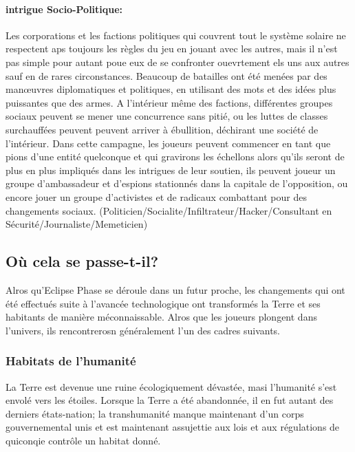 \paragraph{intrigue Socio-Politique:} Les corporations et les factions politiques qui couvrent tout le système solaire ne respectent aps toujours les règles du jeu en jouant avec les autres, mais il n'est pas simple pour autant poue eux de se confronter ouevrtement els uns aux autres sauf en de rares circonstances. Beaucoup de batailles ont été menées par des manœuvres diplomatiques et politiques, en utilisant des mots et des idées plus puissantes que des armes. A l'intérieur même des factions, différentes groupes sociaux peuvent se mener une concurrence sans pitié, ou les luttes de classes surchauffées peuvent peuvent arriver à ébullition, déchirant une société de l'intérieur. Dans cette campagne, les joueurs peuvent commencer en tant que pions d'une entité quelconque et qui gravirons les échellons alors qu'ils seront de plus en plus impliqués dans les intrigues de leur soutien, ils peuvent joueur un groupe d'ambassadeur et d'espions stationnés dans la capitale de l'opposition, ou encore jouer un groupe d'activistes et de radicaux combattant pour des changements sociaux. (Politicien/Socialite/Infiltrateur/Hacker/Consultant en Sécurité/Journaliste/Memeticien) 



\subsection{Où cela se passe-t-il?} \label{sec:where-does-it} 

Alros qu'Eclipse Phase se déroule dans un futur proche, les changements qui ont été effectués suite à l'avancée technologique ont transformés la Terre et ses habitants de manière méconnaissable. Alros que les joueurs plongent dans l'univers, ils rencontrerosn généralement l'un des cadres suivants. 



\subsubsection{Habitats de l'humanité} \label{sec:humanitys-habitats} 

La Terre est devenue une ruine écologiquement dévastée, masi l'humanité s'est envolé vers les étoiles. Lorsque la Terre a été abandonnée,  il en fut autant des derniers états-nation; la transhumanité manque maintenant d'un corps gouvernemental unis et est maintenant assujettie aux lois et aux régulations de quiconqie contrôle un habitat donné. 

